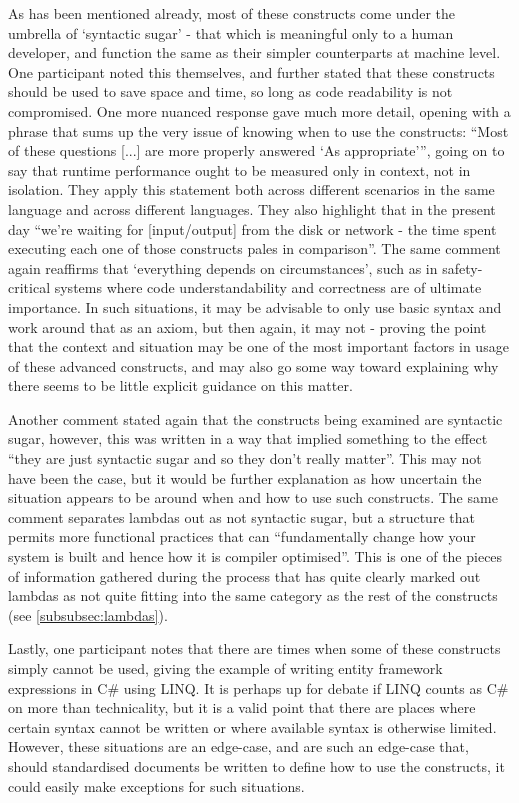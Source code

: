 \documentclass{article}
\begin{document}
            As has been mentioned already, most of these constructs come under the umbrella of `syntactic sugar' - that which is meaningful only to a human developer, and function the same as their simpler counterparts at machine level. One participant noted this themselves, and further stated that these constructs should be used to save space and time, so long as code readability is not compromised. One more nuanced response gave much more detail, opening with a phrase that sums up the very issue of knowing when to use the constructs: ``Most of these questions [...] are more properly answered `As appropriate''', going on to say that runtime performance ought to be measured only in context, not in isolation. They apply this statement both across different scenarios in the same language and across different languages. They also highlight that in the present day ``we're waiting for [input/output] from the disk or network - the time spent executing each one of those constructs pales in comparison''. The same comment again reaffirms that `everything depends on circumstances', such as in safety-critical systems where code understandability and correctness are of ultimate importance. In such situations, it may be advisable to only use basic syntax and work around that as an axiom, but then again, it may not - proving the point that the context and situation may be one of the most important factors in usage of these advanced constructs, and may also go some way toward explaining why there seems to be little explicit guidance on this matter.

            Another comment stated again that the constructs being examined are syntactic sugar, however, this was written in a way that implied something to the effect ``they are just syntactic sugar and so they don't really matter''. This may not have been the case, but it would be further explanation as how uncertain the situation appears to be around when and how to use such constructs. The same comment separates lambdas out as not syntactic sugar, but a structure that permits more functional practices that can ``fundamentally change how your system is built and hence how it is compiler optimised''. This is one of the pieces of information gathered during the process that has quite clearly marked out lambdas as not quite fitting into the same category as the rest of the constructs (see \ref{subsubsec:lambdas}).

            Lastly, one participant notes that there are times when some of these constructs simply cannot be used, giving the example of writing entity framework expressions in C\# using LINQ. It is perhaps up for debate if LINQ counts as C\# on more than technicality, but it is a valid point that there are places where certain syntax cannot be written or where available syntax is otherwise limited. However, these situations are an edge-case, and are such an edge-case that, should standardised documents be written to define how to use the constructs, it could easily make exceptions for such situations.
\end{document}
